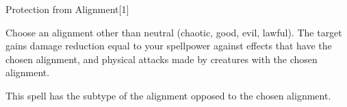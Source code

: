 \begin{spellsection}{Protection from Alignment}[1]
    \begin{spellheader}
    \end{spellheader}
    \begin{spellcontent}
        \begin{spelltargetinginfo}
        \end{spelltargetinginfo}
        \begin{spelleffects}
            \spellspecial Choose an alignment other than neutral (chaotic, good, evil, lawful).
            \spelleffect The target gains damage reduction equal to your spellpower against effects that have the chosen alignment, and physical attacks made by creatures with the chosen alignment.
            \spelldur \durshort \dismissable
        \end{spelleffects}
    \end{spellcontent}
    \begin{spellfooter}
        \spellnotes This spell has the subtype of the alignment opposed to the chosen alignment.
        \miscastrandom
    \end{spellfooter}
    \begin{spellaugments}
    \end{spellaugments}
\end{spellsection}


